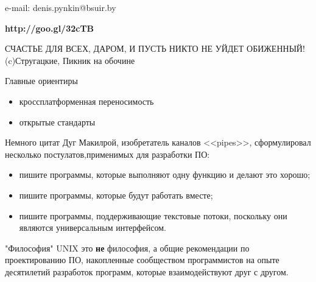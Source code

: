 

\subtitle{Принципы проектирования переносимых программ}

%
%

\begin{frame}
\titlepage
\begin{center}
e-mail: denis.pynkin@bsuir.by\\
\end{center}
\begin{center}
{\bfseries http://goo.gl/32cTB}

{\tiny СЧАСТЬЕ ДЛЯ ВСЕХ, ДАРОМ, И ПУСТЬ НИКТО НЕ УЙДЕТ ОБИЖЕННЫЙ!\\
(c)Стругацкие, Пикник на обочине}
\end{center}
\end{frame}


\begin{frame}{Главные ориентиры}
	\begin{itemize}
		\item кроссплатформенная переносимость
			\pause
		\item открытые стандарты
	\end{itemize}
\end{frame}

\begin{frame}{Немного цитат}
Дуг Макилрой, изобретатель каналов <<pipes>>, сформулировал несколько постулатов,применимых для разработки ПО:
\pause
	\begin{itemize}
		\item пишите программы,  которые выполняют одну функцию и делают это хорошо;
			\pause
		\item пишите программы,  которые будут работать вместе;
			\pause
		\item пишите программы,  поддерживающие текстовые потоки,  поскольку они являются универсальным интерфейсом.
	\end{itemize}

\end{frame}


\begin{frame}{"Философия" UNIX}
	это {\bfseries не} философия,  а общие рекомендации по проектированию ПО,  накопленные сообществом программистов на опыте десятилетий разработок программ,  которые взаимодействуют друг с другом.
\end{frame}

